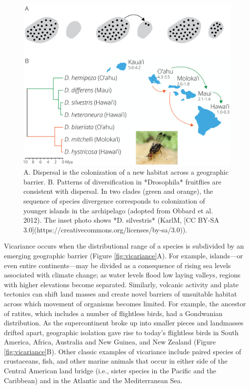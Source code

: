\documentclass[
]{book}
\begin{document}
\begin{figure}
\includegraphics[width=1\linewidth]{images/dispersal} \caption{A. Dispersal is the colonization of a new habitat across a geographic barrier. B. Patterns of diversification in *Drosophila* fruitflies are consistent with dispersal. In two clades (green and orange), the sequence of species divergence corresponds to colonization of younger islands in the archipelago (adopted from Obbard et al. 2012). The inset photo shows *D. silvestris* (KarlM, [CC BY-SA 3.0](https://creativecommons.org/licenses/by-sa/3.0)).}\label{fig:dispersal}
\end{figure}

Vicariance occurs when the distributional range of a species is subdivided by an emerging geographic barrier (Figure \ref{fig:vicariance}A). For example, islands---or even entire continents---may be divided as a consequence of rising sea levels associated with climate change; as water levels flood low laying valleys, regions with higher elevations become separated. Similarly, volcanic activity and plate tectonics can shift land masses and create novel barriers of unsuitable habitat across which movement of organisms becomes limited. For example, the ancestor of ratites, which includes a number of flightless birds, had a Gondwanian distribution. As the supercontinent broke up into smaller pieces and landmasses drifted apart, geographic isolation gave rise to today's flightless birds in South America, Africa, Australia and New Guinea, and New Zealand (Figure \ref{fig:vicariance}B). Other classic examples of vicariance include paired species of crustaceans, fish, and other marine animals that occur in either side of the Central American land bridge (i.e., sister species in the Pacific and the Caribbean) and in the Atlantic and the Mediterranean Sea.
\end{document}
